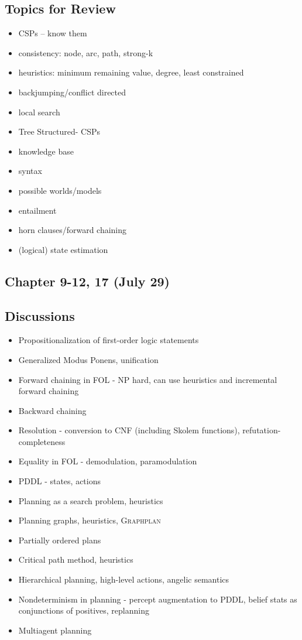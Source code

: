 \subsection*{Topics for Review}
\begin{itemize}
\item CSPs -- know them
\item consistency: node, arc, path, strong-k
\item heuristics: minimum remaining value, degree, least constrained
\item backjumping/conflict directed
\item local search
\item Tree Structured- CSPs
\item knowledge base
\item syntax
\item possible worlds/models
\item entailment
\item horn clauses/forward chaining
\item (logical) state estimation
\end{itemize}

\subsection{Chapter 9-12, 17 (July 29)}
\subsection*{Discussions}
\begin{itemize}
\item Propositionalization of first-order logic statements
\item Generalized Modus Ponens, unification
\item Forward chaining in FOL - NP hard, can use heuristics and incremental forward chaining
\item Backward chaining
\item Resolution - conversion to CNF (including Skolem functions), refutation-completeness
\item Equality in FOL - demodulation, paramodulation
\item PDDL - states, actions
\item Planning as a search problem, heuristics
\item Planning graphs, heuristics, \textsc{Graphplan}
\item Partially ordered plans
\item Critical path method, heuristics
\item Hierarchical planning, high-level actions, angelic semantics
\item Nondeterminism in planning - percept augmentation to PDDL, belief stats as conjunctions of positives, replanning
\item Multiagent planning
\end{itemize}

